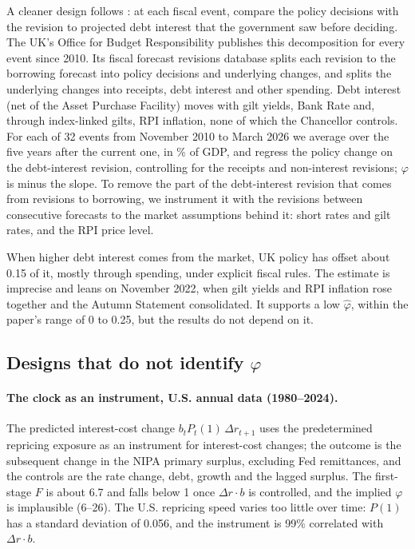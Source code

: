 A cleaner design follows \citet{auerbach2024}: at each fiscal event, compare the policy decisions with the revision to projected debt interest that the government saw before deciding. The UK's Office for Budget Responsibility publishes this decomposition for every event since 2010. Its fiscal forecast revisions database splits each revision to the borrowing forecast into policy decisions and underlying changes, and splits the underlying changes into receipts, debt interest and other spending. Debt interest (net of the Asset Purchase Facility) moves with gilt yields, Bank Rate and, through index-linked gilts, RPI inflation, none of which the Chancellor controls. For each of 32 events from November 2010 to March 2026 we average over the five years after the current one, in \% of GDP, and regress the policy change on the debt-interest revision, controlling for the receipts and non-interest revisions; $\varphi$ is minus the slope. To remove the part of the debt-interest revision that comes from revisions to borrowing, we instrument it with the revisions between consecutive forecasts to the market assumptions behind it: short rates and gilt rates, and the RPI price level.



When higher debt interest comes from the market, UK policy has offset about 0.15 of it, mostly through spending, under explicit fiscal rules. The estimate is imprecise and leans on November 2022, when gilt yields and RPI inflation rose together and the Autumn Statement consolidated. It supports a low $\hat\varphi$, within the paper's range of 0 to 0.25, but the results do not depend on it.

\subsection{\texorpdfstring{Designs that do not identify $\varphi$}{Designs that do not identify phi}}\label{app:fail}

\paragraph{The clock as an instrument, U.S. annual data (1980--2024).} The predicted interest-cost change $b_t P_t(1)\,\Delta r_{t+1}$ uses the predetermined repricing exposure as an instrument for interest-cost changes; the outcome is the subsequent change in the NIPA primary surplus, excluding Fed remittances, and the controls are the rate change, debt, growth and the lagged surplus. The first-stage $F$ is about 6.7 and falls below 1 once $\Delta r\cdot b$ is controlled, and the implied $\varphi$ is implausible (6--26). The U.S. repricing speed varies too little over time: $P(1)$ has a standard deviation of 0.056, and the instrument is 99\% correlated with $\Delta r\cdot b$.

